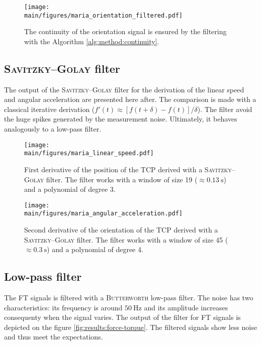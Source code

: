 \documentclass[/home/francois/latex/report/main.tex]{subfiles}
\begin{document}
\begin{figure}[h]
  \centering
  \texttt{[image: \\main/figures/maria\_orientation\_filtered.pdf]}
  \caption{The continuity of the orientation signal is ensured by the filtering with the Algorithm \ref{alg:method:continuity}.}
  \label{fig:results:orientation-filtered}
\end{figure}

\subsection{\textsc{Savitzky–Golay} filter}

The output of the \textsc{Savitzky–Golay} filter for the derivation of the linear speed and angular acceleration are presented here after. The comparison is made with a classical iterative derivation ($f'(t) \approx  [f(t+\delta) - f(t)] / \delta$). The filter avoid the huge spikes generated by the measurement noise. Ultimately, it behaves analogously to a low-pass filter.


\begin{figure}[h]
  \centering
  \texttt{[image: \\main/figures/maria\_linear\_speed.pdf]}
  \caption{First derivative of the position of the \ac{TCP} derived with a \textsc{Savitzky–Golay} filter. The filter works with a window of size 19 ($\approx 0.13 \ \si{\second}$) and a polynomial of degree 3.}
  \label{fig:results:linear-speed-filtered}
\end{figure}

\begin{figure}[h]
  \centering
  \texttt{[image: \\main/figures/maria\_angular\_acceleration.pdf]}
  \caption{Second derivative of the orientation of the \ac{TCP} derived with a \textsc{Savitzky–Golay} filter. The filter works with a window of size 45 ($\approx 0.3 \ \si{\second}$) and a polynomial of degree 4.}
  \label{fig:results:angular-acceleration-filtered}
\end{figure}

\subsection{Low-pass filter}

The \ac{FT} signals is filtered with a \textsc{Butterworth} low-pass filter. The noise has two characteristics: its frequency is around $50 \ \si{\hertz}$ and its amplitude increases consequenty when the signal varies. The output of the filter for \ac{FT} signals is depicted on the figure \ref{fig:results:force-torque}. The filtered signals show less noise and thus meet the expectations.
\end{document}
